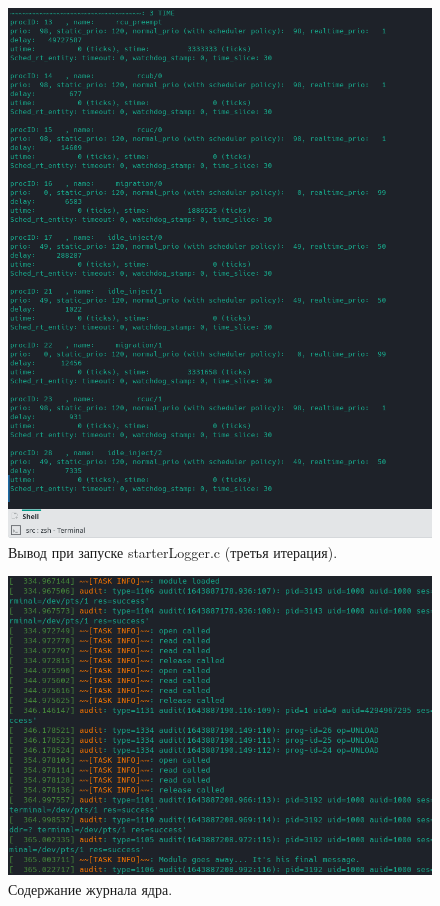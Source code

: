 \begin{figure}[H]
	\centering
	\includegraphics[scale=0.8]{img/thirdIt.png}
	\caption{Вывод при запуске starterLogger.c (третья итерация). }
	\label{fig:thirdIt}
\end{figure}

\begin{figure}[H]
	\centering
	\includegraphics[scale=0.8]{img/dmesg.png}
	\caption{Содержание журнала ядра. }
	\label{fig:dmesg}
\end{figure}